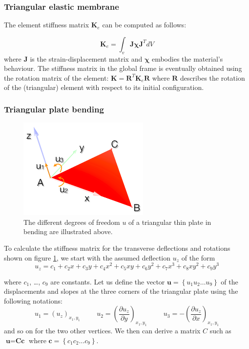 \documentclass{llncs}
\begin{document}
\subsubsection{Triangular elastic membrane}

The element stiffness matrix $\textbf{K}_e$ can be computed as follows:

\begin{equation}
\textbf{K}_e = \int_v \textbf{J} \boldsymbol\chi \textbf{J}^{T} dV
\end{equation}
where $\textbf{J}$ is the strain-displacement matrix and $\boldsymbol\chi$ embodies the material's behaviour. The stiffness matrix in the global frame is eventually obtained using the rotation matrix of the element: $\textbf{K} = \textbf{R}^{T} \textbf{K}_e \textbf{R} $ where $\textbf{R}$ describes the rotation of the (triangular) element with respect to its initial configuration.

\subsubsection{Triangular plate bending}

\begin{figure}
\centering
\includegraphics[height=5cm]{images/bending}
\caption {The different degrees of freedom $u$ of a triangular thin plate in bending are illustrated above.}
\label{fig-triangle}
\end{figure}

To calculate the stiffness matrix for the transverse deflections and rotations shown on figure \ref{fig-triangle}, we start with the assumed deflection $u_z$ of the form
\begin{equation}
 u_z = c_1 + c_2x + c_3y + c_4x^2 + c_5xy + c_6y^2 + c_7x^3 + c_8xy^2 + c_9y^3
\label{eq-deflection}
\end{equation} 

where $c_1$, \ldots , $c_9$ are constants. Let us define the vector $\textbf{u} = \left\{u_1 u_2 \ldots u_9 \right\} $ of the displacements and slopes at the three corners of the triangular plate using the following notations:
\begin{equation}
u_1 = (u_z)_{x_1,y_1} \hspace{1cm} u_2 = \left(\frac{\partial u_z}{\partial y}\right)_{x_1,y_1} \hspace{1cm} u_3 = - \left(\frac{\partial u_z}{\partial x}\right)_{x_1,y_1}
\end{equation} 
and so on for the two other vertices.
We then can derive a matrix $C$ such as $\textbf{u} = \textbf{Cc}$ where $\textbf{c} = \left\{c_1 c_2 \ldots c_9 \right\} $.
\end{document}
